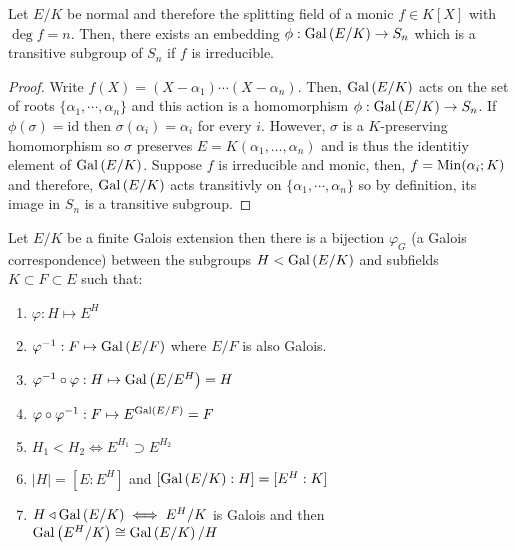 \documentclass[12pt]{extarticle}
\begin{document}
\begin{proposition}
Let $E/K$ be normal and therefore the splitting field of a monic $f \in K[X]$ with $\deg{f} = n$. Then, there exists an embedding $\phi : \mathrm{Gal}\left( E/K \right) \to S_n$ which is a transitive subgroup of $S_n$ if $f$ is irreducible.  
\end{proposition}

\begin{proof}
Write $f(X) = (X - \alpha_1) \cdots (X - \alpha_n)$. Then, $\mathrm{Gal}\left( E/K \right)$ acts on the set of roots $\{\alpha_1, \cdots, \alpha_n\}$ and this action is a homomorphism $\phi : \mathrm{Gal}\left( E/K \right) \to S_n$. If $\phi(\sigma) = \mathrm{id}$ then $\sigma(\alpha_i) = \alpha_i$ for every $i$. However, $\sigma$ is a $K$-preserving homomorphism so $\sigma$ preserves $E = K(\alpha_1, \dots, \alpha_n)$ and is thus the identitiy element of $\mathrm{Gal}\left( E/K \right)$. Suppose $f$ is irreducible and monic, then, $f = \mathrm{Min}(\alpha_i;K)$ and therefore, $\mathrm{Gal}\left( E/K \right)$ acts transitivly on $\{\alpha_1, \cdots, \alpha_n\}$ so by definition, its image in $S_n$ is a transitive subgroup.
\end{proof}


\begin{theorem}
Let $E/K$ be a finite Galois extension then there is a bijection $\varphi_G$ (a Galois correspondence) between the subgroups $H < \mathrm{Gal}\left( E/K \right)$ and subfields $K \subset F \subset E$ such that:

\begin{enumerate}
\item $\varphi : H \mapsto E^H$
\item $\varphi^{-1} : F \mapsto \mathrm{Gal}\left( E/F \right)$ where $E/F$ is also Galois. 
\item $\varphi^{-1} \circ \varphi : H \mapsto \mathrm{Gal}\left( E/E^H \right) = H$
\item $\varphi \circ \varphi^{-1} : F \mapsto E^{\mathrm{Gal}\left( E/F \right)} = F$
\item $H_1 < H_2 \iff E^{H_1} \supset E^{H_2}$
\item $|H| = [E : E^H]$ and $[\mathrm{Gal}\left( E/K \right) : H] = [E^H : K]$ 
\item $H \triangleleft \mathrm{Gal}\left( E/K \right) \iff E^H/K$ is Galois and then $\mathrm{Gal}\left( E^H/K \right) \cong \mathrm{Gal}\left( E/K \right) / H$
\end{enumerate}
\end{theorem}
\end{document}
